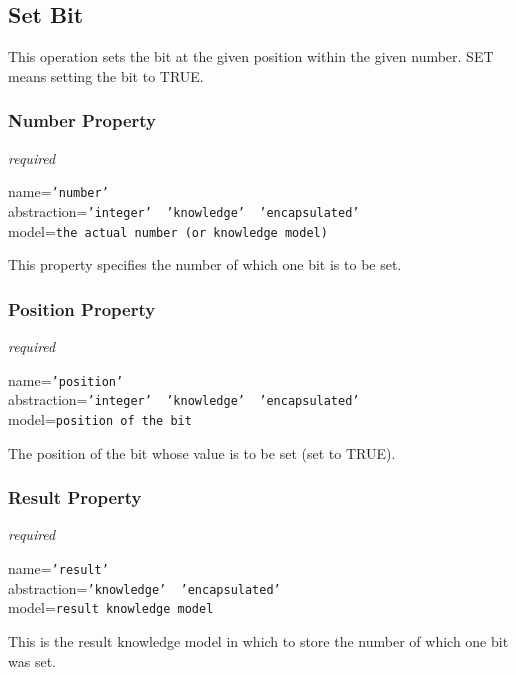 %
%
%
%
%
%

\subsection{Set Bit}
\label{set_bit_heading}

This operation sets the bit at the given position within the given number.
SET means setting the bit to TRUE.

\subsubsection{Number Property}

\emph{required}

name=\texttt{'number'}\\
abstraction=\texttt{'integer' \vline\ 'knowledge' \vline\ 'encapsulated'}\\
model=\texttt{the actual number (or knowledge model)}

This property specifies the number of which one bit is to be set.

\subsubsection{Position Property}

\emph{required}

name=\texttt{'position'}\\
abstraction=\texttt{'integer' \vline\ 'knowledge' \vline\ 'encapsulated'}\\
model=\texttt{position of the bit}

The position of the bit whose value is to be set (set to TRUE).

\subsubsection{Result Property}

\emph{required}

name=\texttt{'result'}\\
abstraction=\texttt{'knowledge' \vline\ 'encapsulated'}\\
model=\texttt{result knowledge model}

This is the result knowledge model in which to store the number of which one
bit was set.
